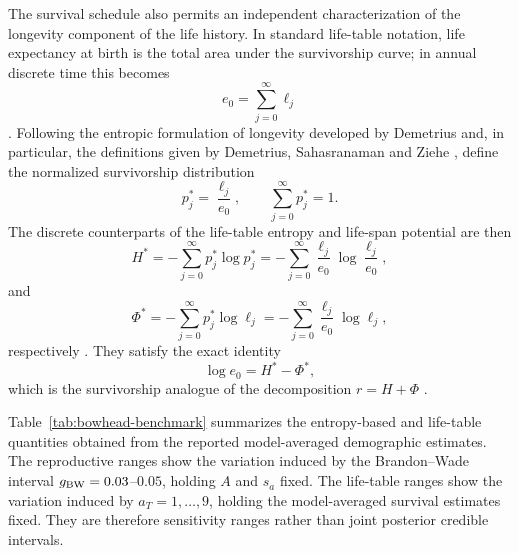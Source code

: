 \documentclass[11pt,a4paper]{amsart}
\begin{document}
The survival schedule also permits an independent characterization
of the longevity component of the life history. In standard
life-table notation, life expectancy at birth is the total area
under the survivorship curve; in annual discrete time this becomes
\begin{equation}
e_0=\sum_{j=0}^{\infty}\ell_j
\label{eq:bowhead-life-expectancy}
\end{equation}
\cite{KeyfitzCaswell2005}. Following the entropic formulation of
longevity developed by Demetrius and, in particular, the definitions
given by Demetrius, Sahasranaman and Ziehe
\cite{Demetrius1974,DemetriusSahasranamanZiehe2024}, define the
normalized survivorship distribution
\begin{equation}
p_j^\ast=\frac{\ell_j}{e_0},
\qquad
\sum_{j=0}^{\infty}p_j^\ast=1.
\label{eq:bowhead-normalized-survivorship}
\end{equation}
The discrete counterparts of the life-table entropy and life-span
potential are then
\begin{equation}
H^\ast
=
-\sum_{j=0}^{\infty}
p_j^\ast\log p_j^\ast
=
-\sum_{j=0}^{\infty}
\frac{\ell_j}{e_0}
\log\frac{\ell_j}{e_0},
\label{eq:bowhead-lifetable-entropy}
\end{equation}
and
\begin{equation}
\Phi^\ast
=
-\sum_{j=0}^{\infty}
p_j^\ast\log\ell_j
=
-\sum_{j=0}^{\infty}
\frac{\ell_j}{e_0}\log\ell_j,
\label{eq:bowhead-lifespan-potential}
\end{equation}
respectively
\cite{DemetriusSahasranamanZiehe2024}. They satisfy the exact
identity
\begin{equation}
\log e_0=H^\ast-\Phi^\ast,
\label{eq:bowhead-lifetable-identity}
\end{equation}
which is the survivorship analogue of the decomposition
$r=H+\Phi$
\cite{Demetrius1974,DemetriusSahasranamanZiehe2024}.

Table~\ref{tab:bowhead-benchmark} summarizes the entropy-based and
life-table quantities obtained from the reported model-averaged
demographic estimates. The reproductive ranges show the variation
induced by the Brandon--Wade interval
$g_{\rm BW}=0.03$--$0.05$, holding $A$ and $s_a$ fixed. The
life-table ranges show the variation induced by
$a_T=1,\ldots,9$, holding the model-averaged survival estimates
fixed. They are therefore sensitivity ranges rather than joint
posterior credible intervals.
\end{document}
